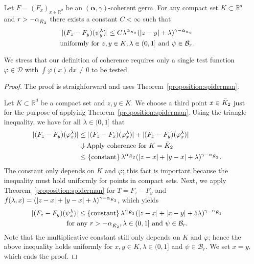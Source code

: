 \begin{theorem}
  Let \( F = (F_x)_{x \in \mathbb{R}^d} \) be an \( (\bm{\alpha}, \gamma) \)-coherent germ. For any compact set \( K \subset \mathbb{R}^d \) and \( r > - \alpha_{\bar{K}_{2}} \) there exists a constant \( C < \infty \) such that
  \begin{gather*}
    |(F_z - F_y)(\psi^\lambda_y)| \leq C \lambda^{\alpha_{\bar{K}_{2}}} (|z - y| + \lambda)^{\gamma - \alpha_{\bar{K}_{2}}}\\
    \text{uniformly for \( z,y \in K, \lambda \in (0,1] \) and \( \psi \in \mathcal{B}_r \).}
  \end{gather*}
\end{theorem}

We stress that our definition of coherence requires only a single test function \( \varphi \in \mathcal{D} \) with \( \int \varphi(x) \, \mathrm{d}x  \neq 0\) to be tested.

\begin{proof}
  The proof is straighforward and uses Theorem~\ref{proposition:spiderman}.

  Let \( K \subset \mathbb{R}^d \) be a compact set and \( z,y \in K \). We choose a third point \( x \in \bar{K}_{2} \) just for the purpose of applying Theorem~\ref{proposition:spiderman}. Using the triangle inequality, we have for all \( \lambda \in (0,1] \) that
  \begin{align*}
    |(F_z - F_y)(\varphi^\lambda_x)| &\leq |(F_z - F_x)(\varphi^\lambda_x)|  + |(F_x - F_y)(\varphi^\lambda_x)| \\
    &\Downarrow \text{Apply coherence for \( K = \bar{K}_{2} \)} \\
    &\leq \left\{ \mathrm{constant} \right\} \lambda^{\alpha_{\bar{K}_{2}}}(|z - x| + |y - x| + \lambda)^{\gamma - \alpha_{\bar{K}_{2}}}.
  \end{align*}
  The constant only depends on \( K \) and \( \varphi \); this fact is important because the inequality must hold uniformly for points in compact sets. Next, we apply Theorem~\ref{proposition:spiderman} for \( T = F_z - F_y \) and \( f(\lambda, x) = (|z - x| + |y-x| + \lambda)^{\gamma - \alpha_{\bar{K}_{2}}} \), which yields 
  \begin{gather*}
    |(F_z - F_y)(\psi^\lambda_x)| \leq \left\{ \mathrm{constant} \right\} \lambda^{\alpha_{\bar{K}_{2}}}(|z - x| + |x-y| + 5\lambda)^{\gamma - \alpha_{\bar{K}_{2}}} \\
    \text{for any \( r > -\alpha_{\bar{K}_{2}}, \lambda \in (0,1] \) and \( \psi \in \mathcal{B}_r \)}.
  \end{gather*}
  Note that the multiplicative constant still only depends on \( K \) and \( \varphi \); hence the above inequality holds uniformly for \( x,y \in K, \lambda \in (0,1] \) and \( \psi \in \mathcal{B}_r \). We set \( x = y \), which ends the proof.
\end{proof}

